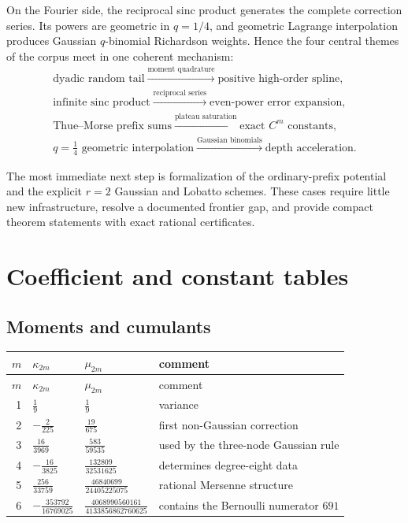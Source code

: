 \documentclass[11pt]{article}
\numberwithin{equation}{section}
\theoremstyle{definition}
\theoremstyle{remark}
\begin{document}
On the Fourier side, the reciprocal sinc product generates the complete correction series.  Its powers are geometric in $q=1/4$, and geometric Lagrange interpolation produces Gaussian $q$-binomial Richardson weights.  Hence the four central themes of the corpus meet in one coherent mechanism:
\begin{equation}
 \boxed{
 \begin{gathered}
 \text{dyadic random tail}
 \xrightarrow{\text{moment quadrature}}
 \text{positive high-order spline},\\
 \text{infinite sinc product}
 \xrightarrow{\text{reciprocal series}}
 \text{even-power error expansion},\\
 \text{Thue--Morse prefix sums}
 \xrightarrow{\text{plateau saturation}}
 \text{exact }C^m\text{ constants},\\
 q=\tfrac14\text{ geometric interpolation}
 \xrightarrow{\text{Gaussian binomials}}
 \text{depth acceleration}.
 \end{gathered}}
 \label{p1:eq:four-way-summary}
\end{equation}

The most immediate next step is formalization of the ordinary-prefix potential and the explicit $r=2$ Gaussian and Lobatto schemes.  These cases require little new infrastructure, resolve a documented frontier gap, and provide compact theorem statements with exact rational certificates.

\appendix
\renewcommand*{\theHsection}{\arabic{part}.\arabic{section}}

\section{Coefficient and constant tables}
\label{p1:app:tables}

\subsection{Moments and cumulants}

\begin{longtable}{@{}rlll@{}}
\toprule
$m$ & $\kappa_{2m}$ & $\mu_{2m}$ & comment\\
\midrule
\endfirsthead
\toprule
$m$ & $\kappa_{2m}$ & $\mu_{2m}$ & comment\\
\midrule
\endhead
1 & $\frac19$ & $\frac19$ & variance\\
2 & $-\frac2{225}$ & $\frac{19}{675}$ & first non-Gaussian correction\\
3 & $\frac{16}{3969}$ & $\frac{583}{59535}$ & used by the three-node Gaussian rule\\
4 & $-\frac{16}{3825}$ & $\frac{132809}{32531625}$ & determines degree-eight data\\
5 & $\frac{256}{33759}$ & $\frac{46840699}{24405225075}$ & rational Mersenne structure\\
6 & $-\frac{353792}{16769025}$ & $\frac{4068990560161}{4133856862760625}$ & contains the Bernoulli numerator $691$\\
\bottomrule
\end{longtable}
\end{document}
